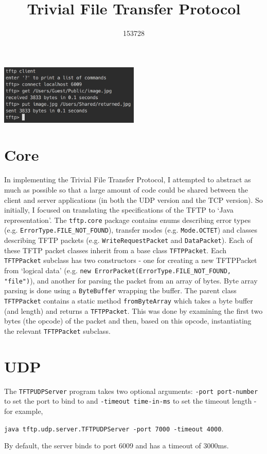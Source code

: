 \documentclass[a4paper]{article}
\title{\vspace{-5ex}Trivial File Transfer Protocol}
\author{153728}
\date{}
\newcommand{\code}{\texttt}
\begin{document}
\maketitle
\vspace{-4ex}
\noindent

\begin{center}
\includegraphics[width=0.5\textwidth]{image}
\end{center}

\section{Core}

In implementing the Trivial File Transfer Protocol, I attempted to abstract as much as possible so that a large amount of code could be shared between the client and server applications (in both the UDP version and the TCP version). So initially, I focused on translating the specifications of the TFTP to `Java representation'. The \code{tftp.core} package contains enums describing error types (e.g. \code{ErrorType.FILE\_NOT\_FOUND}), transfer modes (e.g. \code{Mode.OCTET}) and classes describing TFTP packets (e.g. \code{WriteRequestPacket} and \code{DataPacket}). Each of these TFTP packet classes inherit from a base class \code{TFTPPacket}. Each \code{TFTPPacket} subclass has two constructors - one for creating a new TFTPPacket from `logical data' (e.g. \code{new ErrorPacket(ErrorType.FILE\_NOT\_FOUND, "file")}), and another for parsing the packet from an array of bytes. Byte array parsing is done using a \code{ByteBuffer} wrapping the buffer. The parent class \code{TFTPPacket} contains a static method \code{fromByteArray} which takes a byte buffer (and length) and returns a \code{TFTPPacket}. This was done by examining the first two bytes (the opcode) of the packet and then, based on this opcode, instantiating the relevant \code{TFTPPacket} subclass.

\section{UDP}

The \code{TFTPUDPServer} program takes two optional arguments: \code{-port port-number} to set the port to bind to and \code{-timeout time-in-ms} to set the timeout length - for example,
\begin{center}
\code{java tftp.udp.server.TFTPUDPServer -port 7000 -timeout 4000}.
\end{center}
By default, the server binds to port 6009 and has a timeout of 3000ms.
\end{document}
